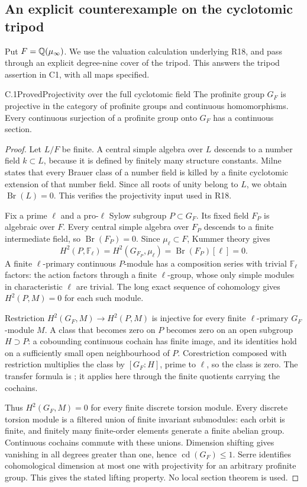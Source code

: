 \subsection{An explicit counterexample on the cyclotomic tripod}
Put $F=\mathbb Q(\mu_\infty)$. We use the valuation calculation underlying R18,
and pass through an explicit degree-nine cover of the tripod. This
answers the tripod assertion in C1, with all maps specified.

\begin{statement}{C.1}{Proved}{Projectivity over the full cyclotomic field}
The profinite group $G_F$ is projective in the category of profinite
groups and continuous homomorphisms. Every continuous surjection of a
profinite group onto $G_F$ has a continuous section.
\end{statement}
\begin{proof}
Let $L/F$ be finite. A central simple algebra over $L$ descends to a
number field $k\subset L$, because it is defined by finitely many
structure constants. Milne \cite[VII, Proposition 7.2]{MilneCFT}
states that every Brauer class of a number field is killed by a finite
cyclotomic extension of that number field. Since all roots of unity
belong to $L$, we obtain $\operatorname{Br}(L)=0$.
This verifies the projectivity input used in R18.

Fix a prime $\ell$ and a pro-$\ell$ Sylow subgroup $P\subset G_F$.
Its fixed field $F_P$ is algebraic over $F$. Every central simple
algebra over $F_P$ descends to a finite intermediate field, so
$\operatorname{Br}(F_P)=0$. Since $\mu_\ell\subset F$, Kummer theory gives
\[
 H^2(P,\mathbb F_\ell)
 =H^2(G_{F_P},\mu_\ell)
 =\operatorname{Br}(F_P)[\ell]=0.
\]
A finite $\ell$-primary continuous $P$-module has a composition series
with trivial $\mathbb F_\ell$ factors: the action factors through a
finite $\ell$-group, whose only simple modules in characteristic
$\ell$ are trivial. The long exact sequence of cohomology gives
$H^2(P,M)=0$ for each such module.

Restriction $H^2(G_F,M)\to H^2(P,M)$ is injective for every finite
$\ell$-primary $G_F$-module $M$. A class that becomes zero on $P$
becomes zero on an open subgroup $H\supset P$: a cobounding continuous
cochain has finite image, and its identities hold on a sufficiently
small open neighbourhood of $P$. Corestriction composed with
restriction multiplies the class by $[G_F:H]$, prime to $\ell$, so
the class is zero. The transfer formula is
\cite[II, Proposition 1.30]{MilneCFT}; it applies here through the
finite quotients carrying the cochains.

Thus $H^2(G_F,M)=0$ for every finite discrete torsion module.
Every discrete torsion module is a filtered union of finite invariant
submodules: each orbit is finite, and finitely many finite-order
elements generate a finite abelian group. Continuous cochains commute
with these unions. Dimension shifting gives vanishing in all degrees
greater than one, hence $\operatorname{cd}(G_F)\leq1$.
Serre \cite[I, \S5.9, Corollary 2 to Proposition 45, p.~58]{SerreGC}
identifies cohomological dimension at most one with projectivity for
an arbitrary profinite group. This gives the stated lifting property.
No local section theorem is used.
\end{proof}

